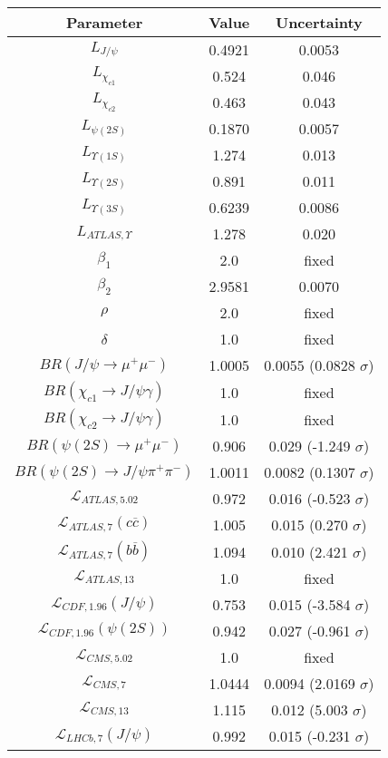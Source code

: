 \begin{table}[h!]
\centering
\begin{tabular}{c|c|c}
Parameter & Value & Uncertainty \\
\hline
$L_{J/\psi}$ & 0.4921 & 0.0053 \\
$L_{\chi_{c1}}$ & 0.524 & 0.046 \\
$L_{\chi_{c2}}$ & 0.463 & 0.043 \\
$L_{\psi(2S)}$ & 0.1870 & 0.0057 \\
$L_{\Upsilon(1S)}$ & 1.274 & 0.013 \\
$L_{\Upsilon(2S)}$ & 0.891 & 0.011 \\
$L_{\Upsilon(3S)}$ & 0.6239 & 0.0086 \\
$L_{ATLAS,\Upsilon}$ & 1.278 & 0.020 \\
$\beta_1$ & 2.0 & fixed \\
$\beta_2$ & 2.9581 & 0.0070 \\
$\rho$ & 2.0 & fixed \\
$\delta$ & 1.0 & fixed \\
$BR(J/\psi\rightarrow\mu^+\mu^-)$ & 1.0005 & 0.0055 (0.0828 $\sigma$) \\
$BR(\chi_{c1}\rightarrow J/\psi\gamma)$ & 1.0 & fixed \\
$BR(\chi_{c2}\rightarrow J/\psi\gamma)$ & 1.0 & fixed \\
$BR(\psi(2S)\rightarrow\mu^+\mu^-)$ & 0.906 & 0.029 (-1.249 $\sigma$) \\
$BR(\psi(2S)\rightarrow J/\psi\pi^+\pi^-)$ & 1.0011 & 0.0082 (0.1307 $\sigma$) \\
$\mathcal L_{ATLAS,5.02}$ & 0.972 & 0.016 (-0.523 $\sigma$) \\
$\mathcal L_{ATLAS,7}(c\overline c)$ & 1.005 & 0.015 (0.270 $\sigma$) \\
$\mathcal L_{ATLAS,7}(b\overline b)$ & 1.094 & 0.010 (2.421 $\sigma$) \\
$\mathcal L_{ATLAS,13}$ & 1.0 & fixed \\
$\mathcal L_{CDF,1.96}(J/\psi)$ & 0.753 & 0.015 (-3.584 $\sigma$) \\
$\mathcal L_{CDF,1.96}(\psi(2S))$ & 0.942 & 0.027 (-0.961 $\sigma$) \\
$\mathcal L_{CMS,5.02}$ & 1.0 & fixed \\
$\mathcal L_{CMS,7}$ & 1.0444 & 0.0094 (2.0169 $\sigma$) \\
$\mathcal L_{CMS,13}$ & 1.115 & 0.012 (5.003 $\sigma$) \\
$\mathcal L_{LHCb,7}(J/\psi)$ & 0.992 & 0.015 (-0.231 $\sigma$) \\

\end{tabular}
\end{table}
